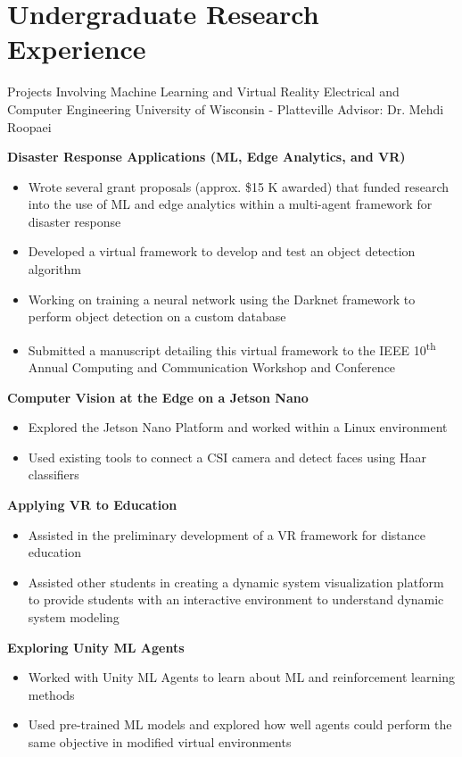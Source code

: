 \section{Undergraduate Research Experience}

{Projects Involving Machine Learning and Virtual Reality}
{Electrical and Computer Engineering}
{University of Wisconsin - Platteville}
{Advisor: Dr. Mehdi Roopaei}
{
\textbf{Disaster Response Applications (ML, Edge Analytics, and VR)}
\begin{itemize}
    \item Wrote several grant proposals (approx. \$15 K awarded) that funded  research into the use of ML and edge analytics within a multi-agent framework for disaster response
    \item Developed a virtual framework to develop and test an object detection algorithm
    \item Working on training a neural network using the Darknet framework to perform object detection on a custom database
    \item Submitted a manuscript detailing this virtual framework to the IEEE 10\textsuperscript{th} Annual Computing and Communication Workshop and Conference
\end{itemize}
\textbf{Computer Vision at the Edge on a Jetson Nano}
\begin{itemize}
    \item Explored the Jetson Nano Platform and worked within a Linux environment
    \item Used existing tools to connect a CSI camera and detect faces using Haar classifiers
\end{itemize}
\textbf{Applying VR to Education}
\begin{itemize}
    \item Assisted in the preliminary development of a VR framework for distance education
    \item Assisted other students in creating a dynamic system visualization platform to provide students with an interactive environment to understand dynamic system modeling
\end{itemize}
\textbf{Exploring Unity ML Agents}
\begin{itemize}
    \item Worked with Unity ML Agents to learn about ML and reinforcement learning methods
    \item Used pre-trained ML models and explored how well agents could perform the same objective in modified virtual environments
\end{itemize}
}

